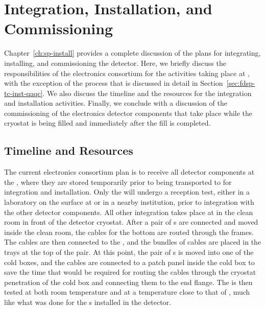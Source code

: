 \section{Integration, Installation, and Commissioning}
\label{sec:fdsp-tpcelec-integration}

Chapter~\ref{ch:sp-install} provides a complete discussion of the plans for 
integrating, installing, and commissioning the detector.
Here, we briefly discuss the responsibilities of the  electronics
consortium for the activities taking place 
at , with the exception of the  process that
is discussed in detail in Section~\ref{sec:fdsp-tc-inst-qaqc}. We also discuss the timeline
and the resources for the integration and installation activities.
Finally, we conclude with a discussion of the commissioning
of the  electronics detector components that take place while
the cryostat is being filled and immediately after the fill is completed.

\subsection{Timeline and Resources}
\label{sec:fdsp-tpcelec-integration-timeline}

The current  electronics consortium plan is to receive all detector 
components at the , where they are stored temporarily
prior to being transported to  for integration and 
installation. Only the  will undergo a reception test,
either in a laboratory on the surface at  or in a nearby
institution, prior to integration with the other  
detector components. All other integration takes place at  in the clean room
in front of the detector cryostat. After a pair of s are 
connected and moved inside the clean room, the  cables
for the bottom  are routed through the  frames.
The cables are then connected to the , and the bundles
of cables are placed in the trays at the top of the  pair.
At this point, the pair of s is moved into one of the cold
boxes, and the cables are connected to a patch panel inside the cold box
to save the time that would be required for routing the cables through the cryostat
penetration of the cold box and connecting them to the end flange.
The  is then tested at both room temperature
and at a temperature close to that of \lntwo, much like
what was done for the s installed in the  detector.

